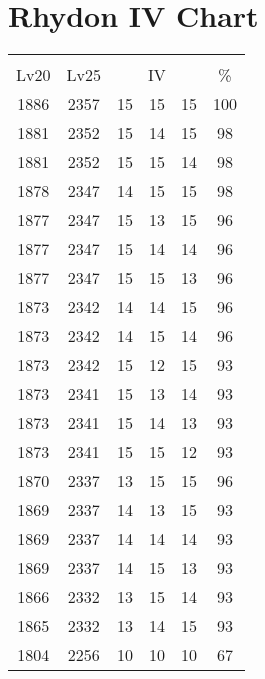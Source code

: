 \documentclass{article}%
\begin{document}
%
\normalsize%
\section{Rhydon IV Chart}%
\label{sec:Rhydon IV Chart}%
\renewcommand{\arraystretch}{1.5}%
\begin{tabular}{|c|c|c|c|c|c|}%
\hline%
\multicolumn{6}{|c|}{\textcolor{white}{ 
\linebreak{Rhydon}
}%
\cellcolor{black}}\\%
\multicolumn{1}{|c}{Lv20}&\multicolumn{1}{c|}{Lv25}&\multicolumn{3}{c|}{IV}&\multicolumn{1}{|c|}{\%}\\%
\hline%
\rowcolor{color100}%
1886&2357&15&15&15&100\\%
\hline%
\rowcolor{color98}%
1881&2352&15&14&15&98\\%
\hline%
\rowcolor{color98}%
1881&2352&15&15&14&98\\%
\hline%
\rowcolor{color98}%
1878&2347&14&15&15&98\\%
\hline%
\rowcolor{color96}%
1877&2347&15&13&15&96\\%
\hline%
\rowcolor{color96}%
1877&2347&15&14&14&96\\%
\hline%
\rowcolor{color96}%
1877&2347&15&15&13&96\\%
\hline%
\rowcolor{color96}%
1873&2342&14&14&15&96\\%
\hline%
\rowcolor{color96}%
1873&2342&14&15&14&96\\%
\hline%
\rowcolor{color93}%
1873&2342&15&12&15&93\\%
\hline%
\rowcolor{color93}%
1873&2341&15&13&14&93\\%
\hline%
\rowcolor{color93}%
1873&2341&15&14&13&93\\%
\hline%
\rowcolor{color93}%
1873&2341&15&15&12&93\\%
\hline%
\rowcolor{color96}%
1870&2337&13&15&15&96\\%
\hline%
\rowcolor{color93}%
1869&2337&14&13&15&93\\%
\hline%
\rowcolor{color93}%
1869&2337&14&14&14&93\\%
\hline%
\rowcolor{color93}%
1869&2337&14&15&13&93\\%
\hline%
\rowcolor{color93}%
1866&2332&13&15&14&93\\%
\hline%
\rowcolor{color93}%
1865&2332&13&14&15&93\\%
\hline%
\rowcolor{color91}%
1804&2256&10&10&10&67\\%
\end{tabular}

%
\end{document}
